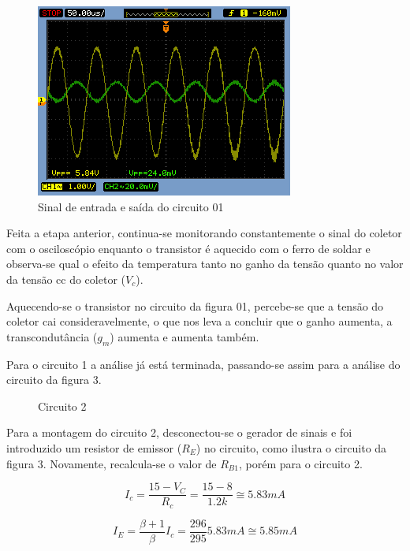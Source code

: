 \documentclass[a4paper]{article} %
\begin{document}
\begin{figure}[h!]
\begin{centering}
\includegraphics[scale=0.5]{figuras03/1_1} \caption{Sinal de entrada e saída do circuito 01 \label{fig:11}}
\par\end{centering}
\end{figure}


Feita a etapa anterior, continua-se monitorando constantemente o sinal do coletor
com o osciloscópio enquanto o transistor é aquecido com o ferro de soldar e observa-se qual o
efeito da temperatura tanto no ganho da tensão quanto no valor da tensão cc do coletor ($V_c$).

Aquecendo-se o transistor no circuito da figura 01, percebe-se que a tensão do coletor
cai consideravelmente, o que nos leva a concluir que o ganho aumenta, a transcondutância
($g_m$) aumenta e aumenta também.

Para o circuito 1 a análise já está terminada, passando-se assim para a análise do
circuito da figura 3.


\vspace{3mm}
\begin{figure}[h!]
\centerline{}
\caption{Circuito 2\label{circ:2}}
\end{figure}

Para a montagem do circuito 2, desconectou-se o gerador de sinais e foi introduzido
um resistor de emissor ($R_E$) no circuito, como ilustra o circuito da figura 3. Novamente,
recalcula-se o valor de $R_{B1}$, porém para o circuito 2.

\begin{displaymath}
I_c=\frac{15-V_C}{R_c}=\frac{15-8}{1.2k}\cong5.83mA
\end{displaymath}

\begin{displaymath}
I_E=\frac{\beta +1}{\beta}I_c=\frac{296}{295}5.83mA\cong5.85mA
\end{displaymath}
\end{document}
